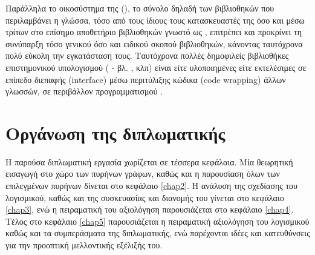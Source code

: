 Παράλληλα το οικοσύστημα της  (), το σύνολο δηλαδή των βιβλιοθηκών που περιλαμβάνει η γλώσσα, τόσο από τους ίδιους τους κατασκευαστές της όσο και μέσω τρίτων στο επίσημο αποθετήριο βιβλιοθηκών γνωστό ως , επιτρέπει και προκρίνει τη συνύπαρξη τόσο γενικού όσο και ειδικού σκοπού βιβλιοθηκών, κάνοντας ταυτόχρονα πολύ εύκολη την εγκατάσταση τους.
Ταυτόχρονα πολλές δημοφιλείς βιβλιοθήκες επιστημονικού υπολογισμού ( - βλ. ,  κλπ) είναι είτε υλοποιημένες είτε εκτελέσιμες σε επίπεδο διεπαφής (interface) μέσω περιτύλιξης κώδικα (code wrapping) άλλων γλωσσών, σε περιβάλλον προγραμματισμού .

\section{Οργάνωση της διπλωματικής}
Η παρούσα διπλωματική εργασία χωρίζεται σε τέσσερα κεφάλαια. Μία θεωρητική εισαγωγή στο χώρο των πυρήνων γράφων, καθώς και η παρουσίαση όλων των επιλεγμένων πυρήνων δίνεται στο κεφάλαιο \ref{chap2}. Η ανάλυση της σχεδίασης του λογισμικού, καθώς και της συσκευασίας και διανομής του γίνεται στο κεφάλαιο \ref{chap3}, ενώ η πειραματική του αξιολόγηση παρουσιάζεται στο κεφάλαιο \ref{chap4}. Τέλος στο κεφάλαιο \ref{chap5} παρουσιάζεται η πειραματική αξιολόγηση του λογισμικού καθώς και τα συμπεράσματα της διπλωματικής, ενώ παρέχονται ιδέες και κατευθύνσεις για την προοπτική μελλοντικής εξέλιξής του.

